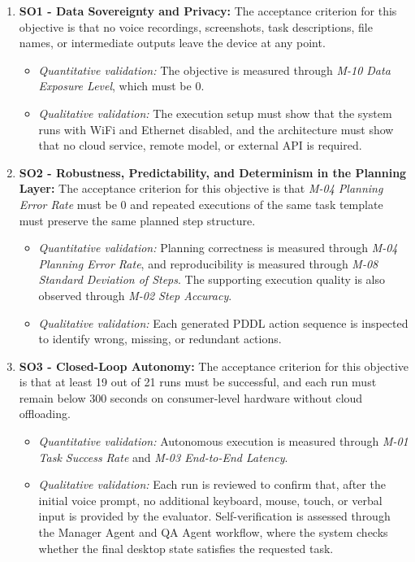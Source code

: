 \begin{enumerate}

    \item \textbf{SO1 - Data Sovereignty and Privacy:}
    The acceptance criterion for this objective is that no voice recordings, screenshots, task descriptions, file names, or intermediate outputs leave the device at any point.

    \begin{itemize}
        \item \textit{Quantitative validation:} The objective is measured through \textit{M-10 Data Exposure Level}, which must be 0.
        \item \textit{Qualitative validation:} The execution setup must show that the system runs with WiFi and Ethernet disabled, and the architecture must show that no cloud service, remote model, or external API is required.
    \end{itemize}

    \item \textbf{SO2 - Robustness, Predictability, and Determinism in the Planning Layer:}
    The acceptance criterion for this objective is that \textit{M-04 Planning Error Rate} must be 0 and repeated executions of the same task template must preserve the same planned step structure.

    \begin{itemize}
        \item \textit{Quantitative validation:} Planning correctness is measured through \textit{M-04 Planning Error Rate}, and reproducibility is measured through \textit{M-08 Standard Deviation of Steps}. The supporting execution quality is also observed through \textit{M-02 Step Accuracy}.
        \item \textit{Qualitative validation:} Each generated PDDL action sequence is inspected to identify wrong, missing, or redundant actions.
    \end{itemize}

    \item \textbf{SO3 - Closed-Loop Autonomy:}
    The acceptance criterion for this objective is that at least 19 out of 21 runs must be successful, and each run must remain below 300 seconds on consumer-level hardware without cloud offloading.

    \begin{itemize}
        \item \textit{Quantitative validation:} Autonomous execution is measured through \textit{M-01 Task Success Rate} and \textit{M-03 End-to-End Latency}.
        \item \textit{Qualitative validation:} Each run is reviewed to confirm that, after the initial voice prompt, no additional keyboard, mouse, touch, or verbal input is provided by the evaluator. Self-verification is assessed through the Manager Agent and QA Agent workflow, where the system checks whether the final desktop state satisfies the requested task.
    \end{itemize}


\end{enumerate}
